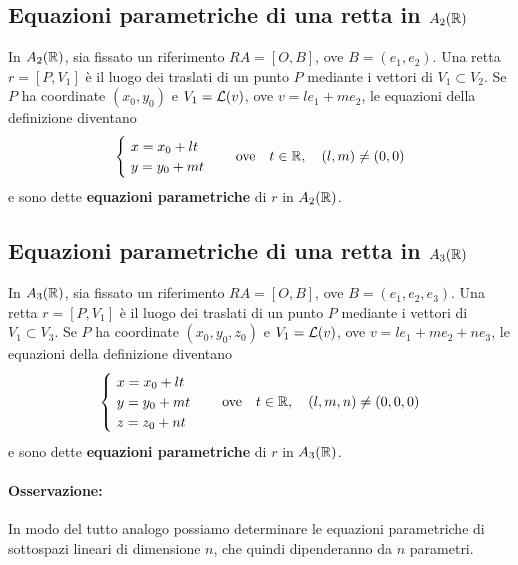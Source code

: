 \documentclass[twoside]{report}
\begin{document}
\subsection{Equazioni parametriche di una retta in \(A_2(\RR )\)} 
In \(A_2(\RR )\), sia fissato un riferimento \(RA = [O, B]\), ove \(B = (e_1, e_2)\). Una retta \(r = [P, V_1]\) è il luogo dei traslati di un punto \(P\) mediante i vettori di \(V_1 \subset V_2\). Se \(P\) ha coordinate \((x_0, y_0)\) e \(V_1 = \mathcal{L}(v) \), ove \(v = le_1 + me_2\), le equazioni della definizione diventano \[
\begin{cases}
    \ x = x_0 + lt \\
    \ y = y_0 + mt \\
\end{cases}
\quad \text{ove}\quad t \in \RR , \quad (l,m) \neq (0,0)\] 
e sono dette \textbf{equazioni parametriche} di \(r\) in \(A_2(\RR )\).

\subsection{Equazioni parametriche di una retta in \(A_3(\RR )\)}
In \(A_3(\RR )\), sia fissato un riferimento \(RA = [O, B]\), ove \(B = (e_1, e_2, e_3)\). Una retta \(r = [P, V_1]\) è il luogo dei traslati di un punto \(P\) mediante i vettori di \(V_1 \subset V_3\). Se \(P\) ha coordinate \((x_0, y_0, z_0)\) e \(V_1 = \mathcal{L}(v) \), ove \(v = le_1 + me_2 + ne_3\), le equazioni della definizione diventano \[
\begin{cases}
    \ x = x_0 + lt \\
    \ y = y_0 + mt \\
    \ z = z_0 + nt \\
\end{cases}
\quad \text{ove}\quad t \in \RR , \quad (l,m,n) \neq (0,0,0)\] 
e sono dette \textbf{equazioni parametriche} di \(r\) in \(A_3(\RR )\).

\paragraph{Osservazione:} In modo del tutto analogo possiamo determinare le equazioni parametriche di sottospazi lineari di dimensione \(n\), che quindi dipenderanno da \(n\) parametri.
\end{document}
